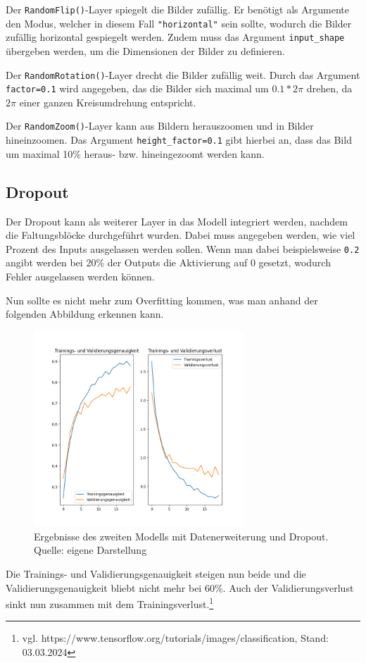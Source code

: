 \documentclass[11pt,oneside]{report}
\begin{document}
Der \verb+RandomFlip()+-Layer spiegelt die Bilder zufällig. Er benötigt als Argumente den Modus, welcher in diesem Fall \verb+"horizontal"+ sein sollte, wodurch die Bilder zufällig horizontal gespiegelt werden. Zudem muss das Argument \verb+input_shape+ übergeben werden, um die Dimensionen der Bilder zu definieren.

Der \verb+RandomRotation()+-Layer drecht die Bilder zufällig weit. Durch das Argument \verb+factor=0.1+ wird angegeben, das die Bilder sich maximal um \(0.1*2\pi\) drehen, da \(2\pi\) einer ganzen Kreisumdrehung entspricht.

Der \verb+RandomZoom()+-Layer kann aus Bildern herauszoomen und in Bilder hineinzoomen. Das Argument \verb+height_factor=0.1+ gibt hierbei an, dass das Bild um maximal 10\% heraus- bzw. hineingezoomt werden kann.

\subsection{Dropout}
Der Dropout kann als weiterer Layer in das Modell integriert werden, nachdem die Faltungsblöcke durchgeführt wurden. Dabei muss angegeben werden, wie viel Prozent des Inputs ausgelassen werden sollen. Wenn man dabei beispielsweise \verb+0.2+ angibt werden bei 20\% der Outputs die Aktivierung auf 0 gesetzt, wodurch Fehler ausgelassen werden können.

Nun sollte es nicht mehr zum Overfitting kommen, was man anhand der folgenden Abbildung erkennen kann.
\begin{figure}[H]
	\centering
	\caption{Ergebnisse des zweiten Modells mit Datenerweiterung und Dropout. Quelle: eigene Darstellung}
	\includegraphics[width=0.7\textwidth]{model}
\end{figure}
Die Trainings- und Validierungsgenauigkeit steigen nun beide und die Validierungsgenauigkeit bliebt nicht mehr bei 60\%. Auch der Validierungsverlust sinkt nun zusammen mit dem Trainingsverlust.\footnote{vgl. https://www.tensorflow.org/tutorials/images/classification, Stand: 03.03.2024}
\end{document}
